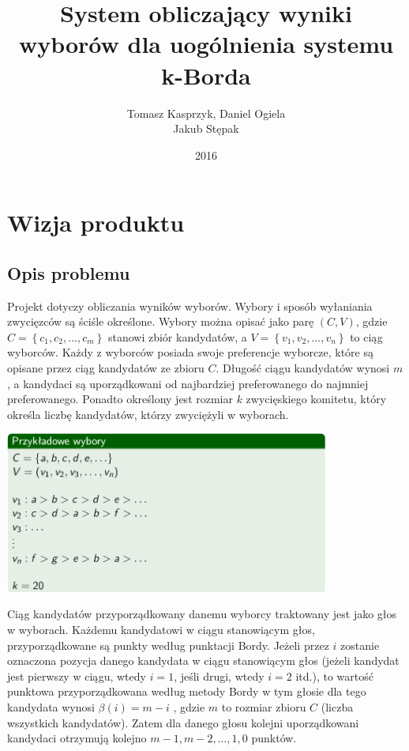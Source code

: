 \documentclass[polish,11pt]{aghthesis}
\author{Tomasz Kasprzyk, Daniel Ogiela\\ Jakub Stępak}
\title{System obliczający wyniki wyborów dla uogólnienia systemu k-Borda}
\date{2016}
\begin{document}
\maketitle
\tableofcontents
\clearpage


\section{Wizja produktu}

\subsection{Opis problemu}
Projekt dotyczy obliczania wyników wyborów. Wybory i sposób wyłaniania zwycięzców są
ściśle określone. Wybory można opisać jako parę $(C, V)$, gdzie $C = \left\{c_1, c_2, ... , c_m\right\}$ stanowi zbiór kandydatów, a $V = \left\{v_1, v_2, ... , v_n\right\}$ to ciąg wyborców. Każdy z wyborców posiada swoje preferencje wyborcze, które są opisane przez ciąg kandydatów ze zbioru $C$. Długość ciągu kandydatów wynosi $m$, a kandydaci są uporządkowani od najbardziej preferowanego do najmniej preferowanego. Ponadto określony jest rozmiar $k$ zwycięskiego komitetu, który określa liczbę kandydatów, którzy zwyciężyli w wyborach.

\begin{center}
\includegraphics[width=0.8\textwidth]{pics/przykladowe_wybory.png}
\end{center}
Ciąg kandydatów przyporządkowany danemu wyborcy traktowany jest jako głos w
wyborach. Każdemu kandydatowi w ciągu stanowiącym głos, przyporządkowane są punkty
według punktacji Bordy. Jeżeli przez $i$ zostanie oznaczona pozycja danego kandydata w
ciągu stanowiącym głos (jeżeli kandydat jest pierwszy w ciągu, wtedy $i = 1$, jeśli drugi, wtedy $i = 2$ itd.), to wartość punktowa przyporządkowana według metody Bordy w tym głosie dla tego kandydata wynosi $\beta(i) = m - i$ , gdzie $m$ to rozmiar zbioru $C$ (liczba wszystkich kandydatów). Zatem dla danego głosu kolejni uporządkowani kandydaci otrzymują kolejno $m - 1, m - 2, … , 1, 0$ punktów.
\end{document}
